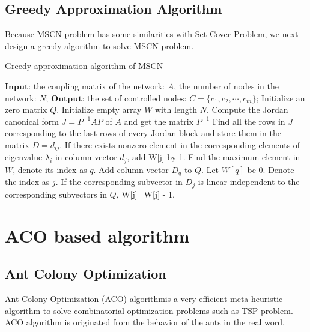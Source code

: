 \documentclass[10pt, conference, letterpaper]{IEEEtran}
\begin{document}
\subsection{Greedy Approximation Algorithm}
Because MSCN problem has some similarities with Set Cover Problem, we next design a greedy algorithm to solve MSCN problem.
\begin{algorithm}
\caption{Greedy approximation algorithm of MSCN}
\label{alg2}
\begin{algorithmic}[1]
\STATE $\textbf{Input:}$ the coupling matrix of the network: $A$, the number of nodes in the network: $N$;
\STATE $\textbf{Output:}$ the set of controlled nodes: $C = \{c_1,c_2,\cdots,c_m\}$;
\STATE Initialize an zero matrix $Q$.
\STATE Initialize empty array $W$ with length $N$.
\STATE Compute the Jordan canonical form $J=P^{-1}AP$ of $A$ and get the matrix $P^{-1}$
\STATE Find all the rows in $J$ corresponding to the last rows of every Jordan block and store them in the matrix $D = d_{ij}$.
\STATE If there exists nonzero element in the corresponding elements of eigenvalue $\lambda_i$ in column vector $d_j$, add W[j] by 1.
\ENDFOR
\ENDFOR
{}
\STATE Find the maximum element in $W$, denote its index as $q$.
\STATE Add column vector $D_q$ to $Q$.
\STATE Let $W[q]$ be 0.
\STATE Denote the index as ${j}$.
\STATE If the corresponding subvector in $D_j$ is linear independent to the corresponding subvectors in $Q$, W[j]=W[j] - 1.
\ENDFOR
\ENDFOR
\ENDWHILE
\end{algorithmic}
\end{algorithm}

\section{ACO based algorithm}
\subsection{Ant Colony Optimization}
Ant Colony Optimization (ACO) algorithmis a very efficient meta heuristic algorithm to solve combinatorial optimization problems such as TSP problem. ACO algorithm is originated from the behavior of the ants in the real word.
\end{document}
